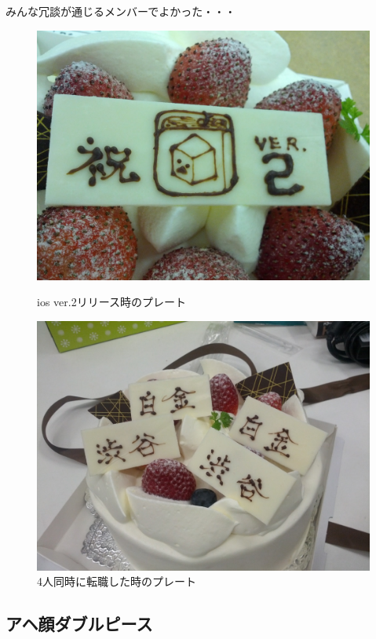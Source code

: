 みんな冗談が通じるメンバーでよかった・・・

\begin{figure}[H]
  \begin{minipage}[t]{0.5\columnwidth}
    \center
    \includegraphics[clip,width=0.9\columnwidth]{../images/cake_ver2.jpg}
    \caption{ios ver.2リリース時のプレート}
  \end{minipage}
  \begin{minipage}[t]{0.5\columnwidth}
    \center
    \includegraphics[clip,width=0.9\columnwidth]{../images/cake_4.jpg}
    \caption{4人同時に転職した時のプレート}
  \end{minipage}
\end{figure}

\subsection{アヘ顔ダブルピース}

